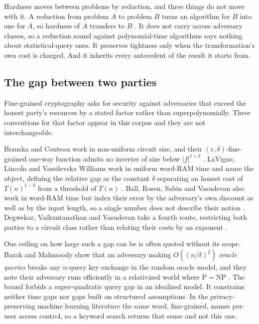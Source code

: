 Hardness moves between problems by reduction, and three things do not move with
it. A reduction from problem $A$ to problem $B$ turns an algorithm for $B$ into one
for $A$, so hardness of $A$ transfers to $B$ \cite{BB20}. It does not carry across
adversary classes, so a reduction sound against polynomial-time algorithms says
nothing about statistical-query ones. It preserves tightness only when the
transformation's own cost is charged. And it inherits every antecedent of the
result it starts from.

\subsection{The gap between two parties}

Fine-grained cryptography asks for security against adversaries that exceed the
honest party's resources by a stated factor rather than superpolynomially. Three
conventions for that factor appear in this corpus and they are not interchangeable.

Brzuska and Couteau work in non-uniform circuit size, and their
$(\varepsilon,\delta)$-fine-grained one-way function admits no inverter of size
below $|f|^{1+\delta}$ \cite{BC22}. LaVigne, Lincoln and Vassilevska Williams work
in uniform word-RAM time and name the object, defining the relative gap as the
constant $\delta$ separating an honest cost of $T(n)^{1-\delta}$ from a threshold of
$T(n)$ \cite{LLW19}. Ball, Rosen, Sabin and Vasudevan also work in word-RAM time but
index their error by the adversary's own discount as well as by the input length, so
a single number does not describe their notion \cite{BRSV17}. Degwekar, Vaikuntanathan
and Vasudevan take a fourth route, restricting both parties to a circuit class rather
than relating their costs by an exponent \cite{DVV16}.

One ceiling on how large such a gap can be is often quoted without its scope. Barak
and Mahmoody show that an adversary making $O((n/\delta)^2)$ \emph{oracle queries}
breaks any $n$-query key exchange in the random oracle model, and they note their
adversary runs efficiently in a relativized world where $\mathrm{P} = \mathrm{NP}$
\cite{BM09}. The bound forbids a super-quadratic query gap in an idealized model. It
constrains neither time gaps nor gaps built on structured assumptions. In the
privacy-preserving machine learning literature the same word, fine-grained, names
per-user access control, so a keyword search returns that sense and not this one.
